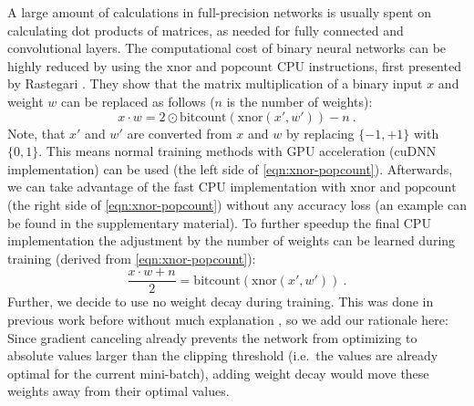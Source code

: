 \documentclass[10pt,twocolumn,letterpaper]{article}
\begin{document}
A large amount of calculations in full-precision networks is usually spent on calculating dot products of matrices, as needed for fully connected and convolutional layers.
The computational cost of binary neural networks can be highly reduced by using the $\mathrm{xnor}$ and $\mathrm{popcount}$ CPU instructions, first presented by Rastegari \etal\cite{Rastegari2016}.
They show that the matrix multiplication of a binary input $x$ and weight $w$ can be replaced as follows ($n$ is the number of weights):
\begin{equation}
\label{eqn:xnor-popcount}
    x \cdot w = 2 \odot \mathrm{bitcount}(\mathrm{xnor}(x',w')) - n~.
\end{equation}
Note, that $x'$ and $w'$ are converted from $x$ and $w$ by replacing $\{-1,+1\}$ with $\{0,1\}$.
This means normal training methods with GPU acceleration (\eg cuDNN implementation) can be used (the left side of \autoref{eqn:xnor-popcount}).
Afterwards, we can take advantage of the fast CPU implementation with $\mathrm{xnor}$ and $\mathrm{popcount}$ (the right side of \autoref{eqn:xnor-popcount}) without any accuracy loss (an example can be found in the supplementary material).
To further speedup the final CPU implementation the adjustment by the number of weights can be learned during training (derived from \autoref{eqn:xnor-popcount}):
\begin{equation}
\label{eqn:xnor-popcount-swapped}
    \frac{x \cdot w + n}{2} = \mathrm{bitcount}(\mathrm{xnor}(x',w'))~.
\end{equation}
Further, we decide to use no weight decay during training.
This was done in previous work before without much explanation \cite{Liu_2018_ECCV}, so we add our rationale here:
Since gradient canceling already prevents the network from optimizing to absolute values larger than the clipping threshold (i.e.~the values are already optimal for the current mini-batch), adding weight decay would move these weights away from their optimal values.
\end{document}
